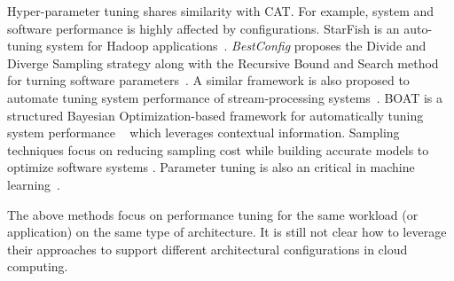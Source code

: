 Hyper-parameter tuning shares similarity with CAT.
For example, system and software performance is highly affected by configurations.
StarFish is an auto-tuning system for Hadoop applications~\cite{herodotou2011starfish}.
\emph{BestConfig} proposes the Divide and Diverge Sampling strategy along with the Recursive Bound and Search method
for turning software parameters~\cite{zhu2017bestconfig}.
A similar framework is also proposed to automate tuning system performance
of stream-processing systems~\cite{bilal2017towards}.
BOAT is a structured Bayesian Optimization-based framework for automatically tuning system performance
~\cite{Dalibard2017} which leverages contextual information.
Sampling techniques focus on reducing sampling cost while building accurate models to optimize software systems \cite{oh2017finding, nair2017}.
Parameter tuning is also an critical in machine learning~\cite{Dewancker2015,shahriari2016taking,Klein2017,golovin2017google}. 

The above methods focus on performance tuning for the same workload (or application)
on the same type of architecture.
It is still not clear how to leverage their approaches
to support different architectural configurations in cloud computing.


